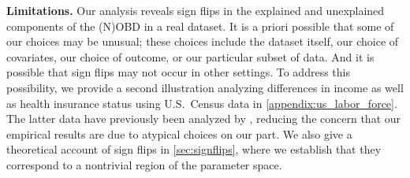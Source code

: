 \textbf{Limitations.}
Our analysis reveals sign flips in the explained and unexplained components of the (N)OBD in a real dataset.
It is a priori possible that some of our choices may be unusual; these choices include the dataset itself, our choice of covariates, our choice of outcome, or our particular subset of data. And it is possible that sign flips may not occur in other settings.
To address this possibility, we provide a second illustration analyzing differences in income as well as health insurance status using U.S.\ Census data in \cref{appendix:us_labor_force}.
The latter data have previously been analyzed by \citet{bach2024heterogeneity}, reducing the concern that our empirical results are due to atypical choices on our part.
We also give a theoretical account of sign flips in \cref{sec:signflips}, where we establish that they correspond to a nontrivial region of the parameter space.